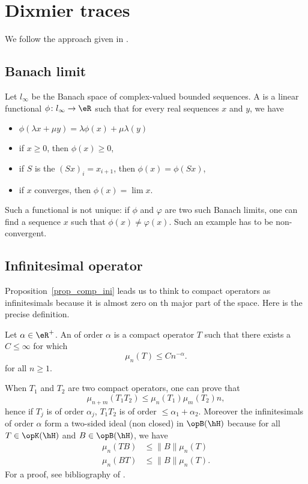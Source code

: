 %
\section{Dixmier traces}
%

We follow the approach given in \cite{Landi,itoNCG_Varilly}.

\subsection{Banach limit}

Let $l_{\infty}$ be the Banach space of complex-valued bounded sequences. A  is a linear functional $\phi\colon l_{\infty}\to \eR$ such that for every real sequences $x$ and $y$, we have
\begin{itemize}
	\item $\phi(\lambda x+\mu y)=\lambda\phi(x)+\mu\lambda(y)$
	\item if $x\geq 0$, then $\phi(x)\geq 0$,
	\item if $S$ is the  $(Sx)_i=x_{i+1}$, then $\phi(x)=\phi(Sx)$,
	\item if $x$ converges, then $\phi(x)=\lim x$.
\end{itemize}
Such a functional is not unique: if $\phi$ and $\varphi$ are two such Banach limits, one can find a sequence $x$ such that $\phi(x)\neq\varphi(x)$. Such an example has to be non-convergent.

\subsection{Infinitesimal operator}

Proposition~\ref{prop_comp_ini} leads us to think to compact operators as infinitesimals because it is almost zero on th major part of the space. Here is the precise definition.

\begin{definition}
	Let $\alpha\in\eR^+$. An  of order $\alpha$ is a compact operator $T$ such that there exists a $C\leq\infty$ for which
	\[
		\mu_n(T)\leq Cn^{-\alpha}.
	\]
	for all $n\geq 1$.
\end{definition}

When $T_1$ and $T_2$ are two compact operators, one can prove that
\[
	\mu_{n+m}(T_1T_2)\leq\mu_n(T_1)\mu_m(T_2)n,
\]
hence if $T_j$ is of order $\alpha_j$, $T_1T_2$ is of order $\leq\alpha_1+\alpha_2$. Moreover the infinitesimals of order $\alpha$ form a two-sided ideal (non closed) in $\opB(\hH)$ because for all $T\in\opK(\hH)$ and $B\in\opB(\hH)$, we have
\begin{equation}
	\begin{split}
		\mu_n(TB)&\leq\| B \|\mu_n(T)\\
		\mu_n(BT)&\leq\| B \|\mu_n(T).
	\end{split}
\end{equation}
For a proof, see bibliography of \cite{Landi}.

